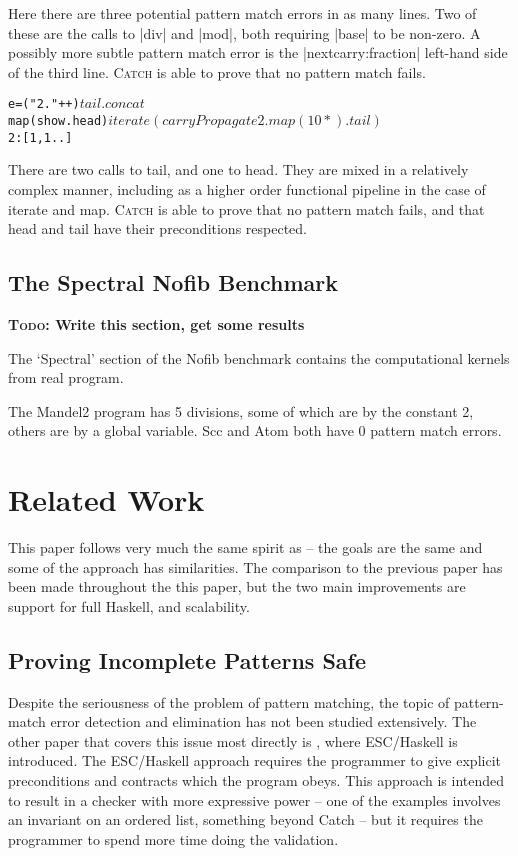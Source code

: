 \documentclass[preprint]{sigplanconf}
\let\cite=\citep
\newcommand{\C}[1]{\textsf{#1}}
\newcommand{\catch}{\textsc{Catch}}
\newcommand{\todo}[1]{\textbf{\textsc{Todo:} #1}}
\newenvironment{code}{\begin{alltt}\small}{\end{alltt}}
\begin{document}
Here there are three potential pattern match errors in as many lines. Two of these are the calls to |div| and |mod|, both requiring |base| to be non-zero. A possibly more subtle pattern match error is the |nextcarry:fraction| left-hand side of the third line. \catch{} is able to prove that no pattern match fails.

\begin{code}
e =  ("2."++) $
     tail . concat $
     map (show.head) $
     iterate (carryPropagate 2 . map (10*) . tail) $
     2:[1,1..]
\end{code}

There are two calls to \C{tail}, and one to \C{head}. They are mixed in a relatively complex manner, including as a higher order functional pipeline in the case of \C{iterate} and \C{map}. \catch{} is able to prove that no pattern match fails, and that \C{head} and \C{tail} have their preconditions respected.

\subsection{The Spectral Nofib Benchmark}
\label{sec:spectral}

\todo{Write this section, get some results}

The `Spectral' section of the Nofib benchmark contains the computational kernels from real program.

The Mandel2 program has 5 divisions, some of which are by the constant 2, others are by a global variable. Scc and Atom both have 0 pattern match errors.


\section{Related Work}
\label{sec:related}

This paper follows very much the same spirit as \cite{me:catch_tfp} -- the goals are the same and some of the approach has similarities. The comparison to the previous paper has been made throughout the this paper, but the two main improvements are support for full Haskell, and scalability.

\subsection{Proving Incomplete Patterns Safe}

Despite the seriousness of the problem of pattern matching, the topic of pattern-match error detection and elimination has not been studied extensively. The other paper that covers this issue most directly is \citep{esc_haskell}, where ESC/Haskell is introduced. The ESC/Haskell approach requires the programmer to give explicit preconditions and contracts which the program obeys. This approach is intended to result in a checker with more expressive power -- one of the examples involves an invariant on an ordered list, something beyond Catch -- but it requires the programmer to spend more time doing the validation.
 
\end{document}
